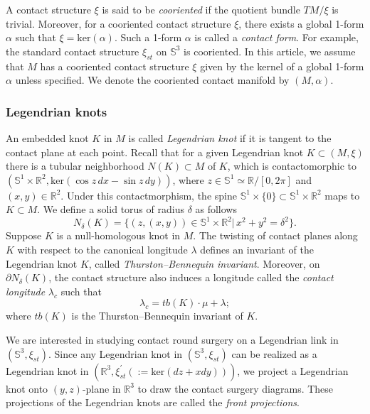 \documentclass{amsart}
\theoremstyle{plain}
\theoremstyle{remark}
\theoremstyle{definition}
\newcommand{\R}{\mathbb{R}}
\newcommand{\s}{\mathbb{S}}
\newcommand{\dd}{\partial}
\begin{document}
A contact structure $\xi$ is said to be {\it cooriented} if the quotient bundle $TM/\xi $ is trivial. 
Moreover, for a cooriented contact structure $\xi$, there exists a global 1-form $\alpha$ such that $\xi= \text{ker}(\alpha)$.
Such a 1-form $\alpha$ is called a {\it contact form}. 
For example, the standard contact structure $\xi_{st}$ on $\s^3$ is cooriented. 
In this article, we assume that $M$ has a cooriented contact structure $\xi$ given by the kernel of a global 1-form $\alpha$ unless specified. 
We denote the cooriented contact manifold by $(M,\alpha)$. 

\subsubsection{Legendrian knots}
An embedded knot $K$ in $M$ is called {\it Legendrian knot} if it is tangent to the contact plane at each point. 
Recall that for a given Legendrian knot $K \subset (M, \xi)$ there is a tubular neighborhood $N(K)\subset M$ of $K$, which is contactomorphic to $(\s^1 \times \R^2, \text{ker}(\cos z \,  dx - \sin z\,  dy))$, where $z \in \s^1 \simeq \R/[0, 2\pi]$ and $(x,y) \in \R^2$. 
Under this contactmorphism, the spine $\s^1 \times \{0\} \subset \s^1 \times \R^2$ maps to $K \subset M$. 
We define a solid torus of radius $\delta$ as follows
\[ N_{\delta}(K)= \{(z, (x,y)) \in \s^1 \times \R^2 | \,  x^2 +y^2 = \delta^2\}. \]
Suppose $K$ is a null-homologous knot in $M$. 
The twisting of contact planes along $K$ with respect to the canonical longitude $\lambda$ defines an invariant of the Legendrian knot $K$, called {\it Thurston--Bennequin invariant}.
Moreover, on $\partial N_{\delta}(K)$, the contact structure also induces a longitude called the {\it contact longitude} $\lambda_c$ such that 
        $$\lambda_c = tb(K) \cdot \mu + \lambda; $$ 
        where $tb(K)$ is the Thurston--Bennequin invariant of $K$.

We are interested in studying contact round surgery on a Legendrian link in $\left(\s^3, \xi_{st}\right)$. 
Since any Legendrian knot in $\left(\s^3, \xi_{st}\right)$ can be realized as a Legendrian knot in $\left(\R^3, \xi_{st}^{\prime}(:=\text{ker}(dz+xdy))\right)$, we project a Legendrian knot onto $(y,z)$-plane in $\R^3$ to draw the contact surgery diagrams.  
These projections of the Legendrian knots are called the {\it front projections}. 
\end{document}
